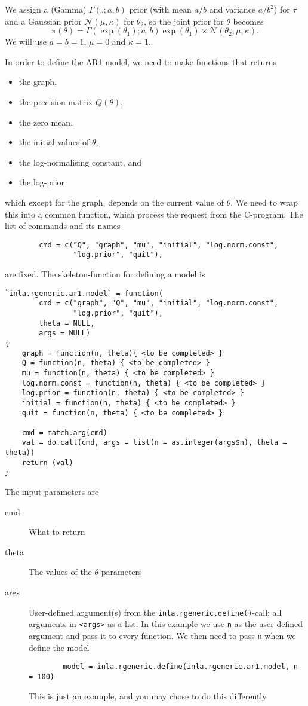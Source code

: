 \documentclass[a4paper,11pt]{article}
\begin{document}
We assign a (Gamma) $\Gamma(.; a,b)$ prior (with mean $a/b$ and
variance $a/b^{2}$) for $\tau$ and a Gaussian prior
${\mathcal N}(\mu,\kappa)$ for $\theta_{2}$, so the joint prior for
$\theta$ becomes
\begin{displaymath}
    \pi(\theta) = \Gamma(\exp(\theta_1); a,b) \exp(\theta_1) \times
    {\mathcal N}(\theta_{2}; \mu, \kappa).
\end{displaymath}
We will use $a=b=1$, $\mu=0$ and $\kappa=1$.

In order to define the AR1-model, we need to make functions that
returns
\begin{itemize}
\item the graph,
\item the precision matrix $Q(\theta)$,
\item the zero mean,
\item the initial values of $\theta$,
\item the log-normalising constant, and
\item the log-prior
\end{itemize}
which except for the graph, depends on the current value of
$\theta$. We need to wrap this into a common function, which process
the request from the C-program. The list of commands and its names
{\small
\begin{verbatim}
        cmd = c("Q", "graph", "mu", "initial", "log.norm.const",
                "log.prior", "quit"),
\end{verbatim}
}
are fixed.  The skeleton-function for defining a model is 
{\small
\begin{verbatim}
`inla.rgeneric.ar1.model` = function(
        cmd = c("graph", "Q", "mu", "initial", "log.norm.const",
                "log.prior", "quit"),
        theta = NULL,
        args = NULL)
{
    graph = function(n, theta){ <to be completed> }
    Q = function(n, theta) { <to be completed> }
    mu = function(n, theta) { <to be completed> }
    log.norm.const = function(n, theta) { <to be completed> }
    log.prior = function(n, theta) { <to be completed> }
    initial = function(n, theta) { <to be completed> }
    quit = function(n, theta) { <to be completed> }

    cmd = match.arg(cmd)
    val = do.call(cmd, args = list(n = as.integer(args$n), theta = theta))
    return (val)
}
\end{verbatim}
}
The input parameters are
\begin{description}
\item[cmd] What to return
\item[theta] The values of the $\theta$-parameters
\item[args] User-defined argument(s) from the
    \texttt{inla.rgeneric.define()}-call; all arguments in
    \texttt{<args>} as a list. In this example we use \texttt{n} as
    the user-defined argument and pass it to every function. We then
    need to pass \texttt{n} when we define the model {\small
\begin{verbatim}
        model = inla.rgeneric.define(inla.rgeneric.ar1.model, n = 100)
\end{verbatim}
}
    This is just an example, and you may chose to do this differently.
\end{description}
\end{document}
